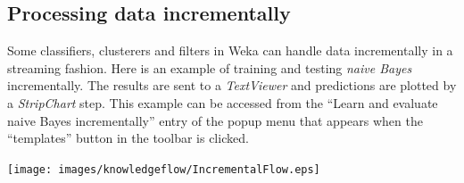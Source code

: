 \begin{center}
\end{center}


\newpage
\subsection{Processing data incrementally}

Some classifiers, clusterers and filters in Weka can handle data
incrementally in a streaming fashion. Here is an example of training
and testing \textit{naive Bayes} incrementally. The results are sent
to a \textit{TextViewer} and predictions are plotted by a
\textit{StripChart} step. This example can be accessed from the
``Learn and evaluate naive Bayes incrementally'' entry of the popup menu that
appears when the ``templates'' button in the toolbar is clicked.

\begin{center}
  \texttt{[image: images/knowledgeflow/IncrementalFlow.eps]}
\end{center}


